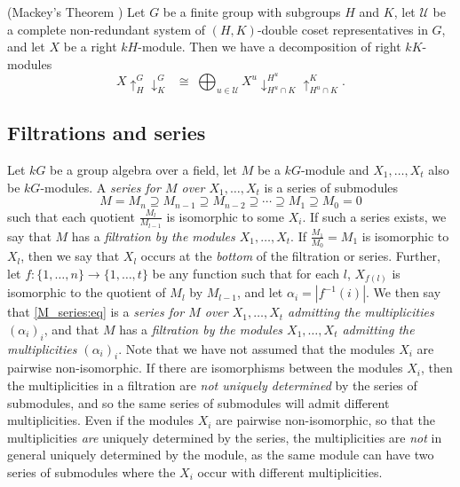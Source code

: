 \begin{theo}\label{mackey:thm}\textup{(}Mackey's Theorem \cite[Theorem 3.3.4]{BRCI}\textup{)}
Let $G$ be a finite group with subgroups $H$ and $K$, let $\mathcal{U}$ be a complete non-redundant system of $(H,K)$-double coset
representatives in $G$, and let $X$ be a right $kH$-module. Then we have a decomposition of right $kK$-modules
\[
X\!\uparrow^{G}_{H}\downarrow^{G}_{K} \;\;\cong\;
\bigoplus_{u \in \mathcal{U}} X^u\downarrow^{H^u}_{H^u\cap K}\uparrow^{K}_{H^u\cap K}.
\]
\end{theo}

\subsection{Filtrations and series}\label{filt_ser:subsec}
Let $kG$ be a group algebra over a field, let $M$ be a $kG$-module and $X_1,\ldots,X_t$ also be $kG$-modules. A \textit{series for $M$
over $X_1,\ldots,X_t$} is a series of submodules
\begin{equation}\label{M_series:eq}
  M = M_n \supseteq M_{n-1} \supseteq M_{n-2} \supseteq \cdots \supseteq M_1 \supseteq M_0 = 0
\end{equation}
such that each quotient $\frac{M_l}{M_{l-1}}$ is isomorphic to some $X_i$. If such a series exists, we say that $M$ has a
\textit{filtration by the modules $X_1,\ldots,X_t$}. If $\frac{M_1}{M_0} = M_1$ is isomorphic to $X_l$, then we say that $X_l$ occurs at
the \textit{bottom} of the filtration or series. Further, let $f:\{1,\ldots,n\} \longrightarrow \{1,\ldots,t\}$ be any function such
that for each $l$, $X_{f(l)}$ is isomorphic to the quotient of $M_l$ by $M_{l-1}$, and let $\alpha_i = |f^{-1}(i)|$. We then say that
\eqref{M_series:eq}
is a \textit{series for $M$ over $X_1,\ldots,X_t$ admitting the multiplicities $(\alpha_i)_i$}, and that $M$ has a
\textit{filtration by the modules $X_1,\ldots,X_t$ admitting the multiplicities $(\alpha_i)_i$}.
Note that we have not assumed that the modules $X_i$ are pairwise non-isomorphic. If there are isomorphisms between the modules
$X_i$, then the multiplicities in a filtration are \textit{not uniquely determined} by the series of submodules, and so the same series
of submodules will admit different multiplicities. Even if the modules $X_i$ are pairwise non-isomorphic, so that the multiplicities
\textit{are} uniquely determined by the series, the multiplicities are \textit{not} in general uniquely determined by the module,
as the same module can have two series of submodules where the $X_i$ occur with different multiplicities.

